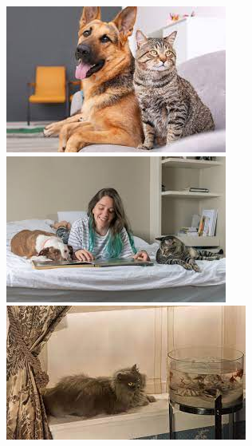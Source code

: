 \begin{figure}
\centering
\begin{minipage}{0.3\textwidth}%
 \includegraphics[width=\textwidth]{Graphics/Images/image_10.jpg}
 \caption{ }
 \label{fig:10}
\end{minipage}%
\begin{minipage}{0.3\textwidth}
 \includegraphics[width=\textwidth]{Graphics/Images/image_11.jpg}
 \caption{ }
 \label{fig:11}
\end{minipage}
\begin{minipage}{0.3\textwidth}
 \includegraphics[width=\textwidth]{Graphics/Images/image_12.jpg}
 \caption{ }
 \label{fig:12}
\end{minipage}
\end{figure}

